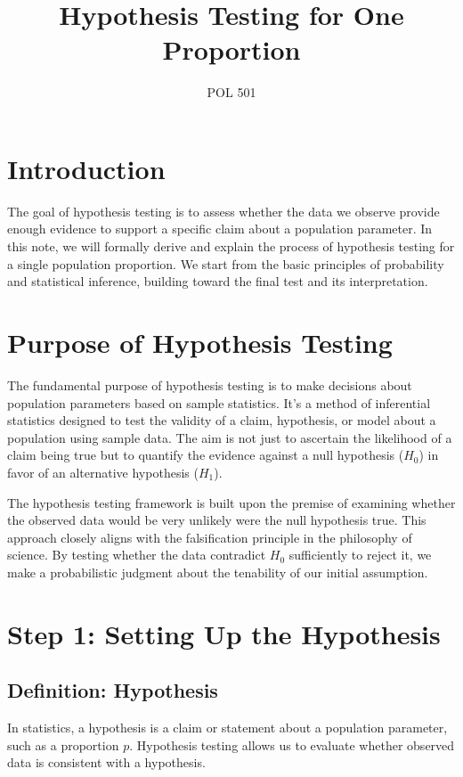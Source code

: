 \documentclass[11pt]{article}
\begin{document}
\title{Hypothesis Testing for One Proportion}
\author{POL 501}
\date{}
\maketitle

\section*{Introduction}

The goal of hypothesis testing is to assess whether the data we observe provide enough evidence to support a specific claim about a population parameter. In this note, we will formally derive and explain the process of hypothesis testing for a single population proportion. We start from the basic principles of probability and statistical inference, building toward the final test and its interpretation.

\section*{Purpose of Hypothesis Testing}

The fundamental purpose of hypothesis testing is to make decisions about population parameters based on sample statistics. It's a method of inferential statistics designed to test the validity of a claim, hypothesis, or model about a population using sample data. The aim is not just to ascertain the likelihood of a claim being true but to quantify the evidence against a null hypothesis (\( H_0 \)) in favor of an alternative hypothesis (\( H_1 \)).

The hypothesis testing framework is built upon the premise of examining whether the observed data would be very unlikely were the null hypothesis true. This approach closely aligns with the falsification principle in the philosophy of science. By testing whether the data contradict \( H_0 \) sufficiently to reject it, we make a probabilistic judgment about the tenability of our initial assumption.

\section*{Step 1: Setting Up the Hypothesis}

\subsection*{Definition: Hypothesis}
In statistics, a hypothesis is a claim or statement about a population parameter, such as a proportion \( p \). Hypothesis testing allows us to evaluate whether observed data is consistent with a hypothesis.
\end{document}
